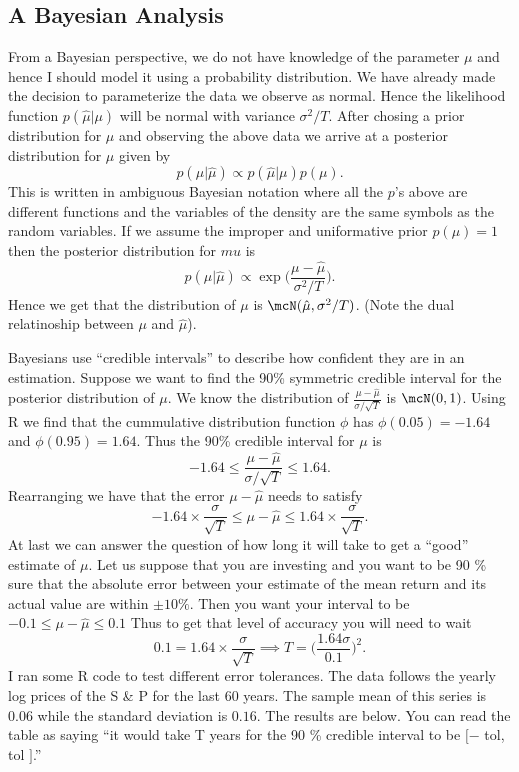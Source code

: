 \documentclass{report}
\begin{document}
\subsection{A Bayesian Analysis}

From a Bayesian perspective, we do not have knowledge of the parameter
$\mu$ and hence I should model it using a probability distribution. 
We have already made the decision to parameterize the data we observe
as normal.  Hence the likelihood function $p(\hat \mu | \mu)$ will be
normal with variance $\sigma^2 / T$.  After chosing a prior
distribution for $\mu$ and observing the above data we arrive at a
posterior distribution for $\mu$ given by
\[
p(\mu | \hat \mu) \propto p(\hat \mu | \mu) p(\mu).
\]
This is written in ambiguous Bayesian notation where all the $p$'s
above are different functions and the variables of the density are the
same symbols as the random variables.  If we assume the improper and
uniformative prior $p(\mu) = 1$ then the posterior distribution for
$mu$ is
\[
p(\mu | \hat \mu) \propto \exp \Big( \frac{\mu - \hat \mu}{\sigma^2 /
T} \Big).
\]
Hence we get that the distribution of $\mu$ is $\mcN(\hat \mu,
\sigma^2 / T)$.  (Note the dual relatinoship between $\mu$ and $\hat
\mu$).  

Bayesians use ``credible intervals'' to describe how confident they
are in an estimation.  Suppose we want to find the 90\% symmetric
credible interval for the posterior distribution of $\mu$.  We know
the distribution of $\frac{\mu-\hat \mu}{\sigma / \sqrt{T}}$ is
$\mcN(0,1)$.  Using R we find that the cummulative distribution
function $\phi$ has $\phi(0.05) = -1.64$ and $\phi(0.95) = 1.64$. 
Thus the 90\% credible interval for $\mu$ is
\[
-1.64 \leq \frac{\mu-\hat \mu}{\sigma / \sqrt{T}} \leq 1.64.
\]
Rearranging we have that the error $\mu - \hat \mu$ needs to satisfy
\[
- 1.64 \times \frac{\sigma}{\sqrt{T}} \leq \mu - \hat \mu \leq 1.64
\times \frac{\sigma}{\sqrt{T}}.
\]
At last we can answer the question of how long it will take to get a
``good'' estimate of $\mu$.  Let us suppose that you are investing and
you want to be 90 \% sure that the absolute error between your
estimate of the mean return and its actual value are within $\pm 10
\%$.  Then you want your interval to be $-0.1 \leq \mu - \hat \mu \leq
0.1$  Thus to get that level of accuracy you will need to wait
\[
0.1 = 1.64 \times \frac{\sigma}{\sqrt{T}} \implies T = \big(
\frac{1.64 \sigma}{0.1} \Big)^2.
\]
I ran some R code to test different error tolerances.  The data
follows the yearly log prices of the S \& P for the last 60 years. 
The sample mean of this series is $0.06$ while the standard deviation
is $0.16$.  The results are below.  You can read the table as saying
``it would take T years for the 90 \% credible interval to be $[-$
tol, tol $]$.''
\end{document}
